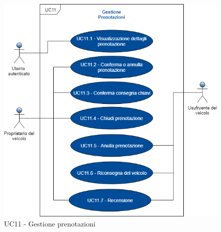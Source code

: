 \begin{figure}[h]
	\includegraphics[width=12cm]{res/images/UC12Prenotazioni.png}
	\centering
	\caption{UC11 - Gestione prenotazioni}
\end{figure}
